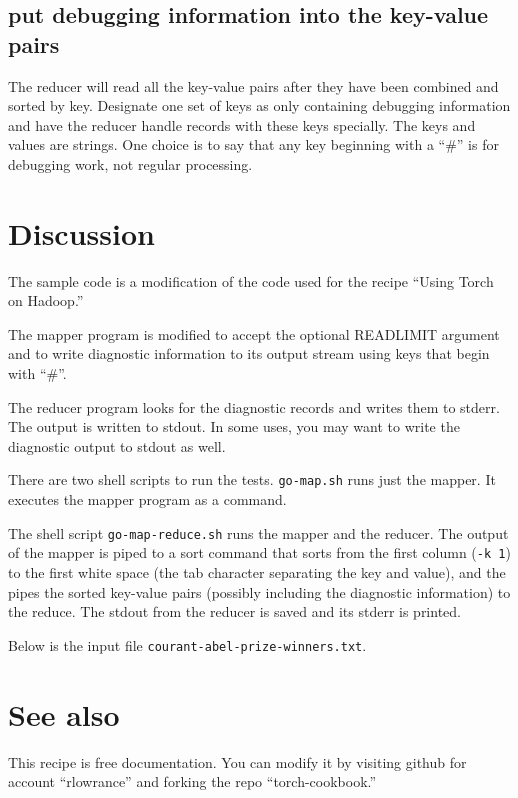 \documentclass{article}
\let\code\texttt %
\begin{document}
\subsection{put debugging information into the key-value pairs}

The reducer will read all the key-value pairs after they have been
combined and sorted by key. Designate one set of keys as only containing
debugging information and have the reducer handle records with these
keys specially. The keys and values are strings. One choice is to say
that any key beginning with a ``\#'' is for debugging work, not regular
processing.


\section{Discussion}

The sample code is a modification of the code used for the recipe
``Using Torch on Hadoop.''

The mapper program is modified to accept the optional READLIMIT
argument and to write diagnostic information to its output stream using
keys that begin with ``\#''.



The reducer program looks for the diagnostic records and writes them to
stderr. The output is written to stdout. In some uses, you may want to
write the diagnostic output to stdout as well.



There are two shell scripts to run the tests. \code{go-map.sh} runs just
the mapper. It executes the mapper program as a command.



The shell script \code{go-map-reduce.sh} runs the mapper and the
reducer. The output of the mapper is piped to a sort command that sorts
from the first column (\code{-k 1}) to the first white space (the tab
character separating the key and value), and the pipes the sorted
key-value pairs (possibly including the diagnostic information) to the
reduce. The stdout from the reducer is saved and its stderr is printed.



Below is the input file \code{courant-abel-prize-winners.txt}.



\section{See also}

This recipe is free documentation. You can modify it by visiting
github for account ``rlowrance'' and forking the repo
``torch-cookbook.''
\end{document}
